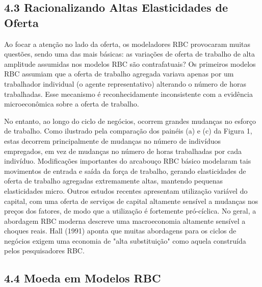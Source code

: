 \documentclass[12pt]{article}
\begin{document}
\subsection{4.3 Racionalizando Altas Elasticidades de Oferta}

Ao focar a atenção no lado da oferta, os modeladores RBC provocaram muitas questões, sendo uma das mais básicas: as variações de oferta de trabalho de alta amplitude assumidas nos modelos RBC são contrafatuais? Os primeiros modelos RBC assumiam que a oferta de trabalho agregada variava apenas por um trabalhador individual (o agente representativo) alterando o número de horas trabalhadas. Esse mecanismo é reconhecidamente inconsistente com a evidência microeconômica sobre a oferta de trabalho.

No entanto, ao longo do ciclo de negócios, ocorrem grandes mudanças no esforço de trabalho. Como ilustrado pela comparação dos painéis (a) e (c) da Figura 1, estas decorrem principalmente de mudanças no número de indivíduos empregados, em vez de mudanças no número de horas trabalhadas por cada indivíduo. Modificações importantes do arcabouço RBC básico modelaram tais movimentos de entrada e saída da força de trabalho, gerando elasticidades de oferta de trabalho agregadas extremamente altas, mantendo pequenas elasticidades micro. Outros estudos recentes apresentam utilização variável do capital, com uma oferta de serviços de capital altamente sensível a mudanças nos preços dos fatores, de modo que a utilização é fortemente pró-cíclica. No geral, a abordagem RBC moderna descreve uma macroeconomia altamente sensível a choques reais. Hall (1991) aponta que muitas abordagens para os ciclos de negócios exigem uma economia de "alta substituição" como aquela construída pelos pesquisadores RBC.

\subsection{4.4 Moeda em Modelos RBC}
\end{document}
